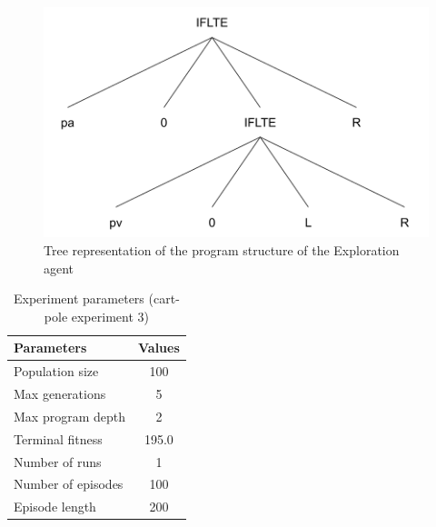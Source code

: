 \begin{figure}[ht]
    \centering
    \includegraphics[width=12cm]{images/complex_iflte_program.png}
    \caption{Tree representation of the program structure of the Exploration agent}
    \label{fig:deep_iflte_tree}
\end{figure}

\begin{table}[ht]
    \centering
    \begin{tabular}{|l|c|}
        \hline
        \textbf{Parameters} & \textbf{Values} \\
        \hline
        Population size     & 100  \\
        Max generations     & 5  \\
        Max program depth   & 2  \\
        Terminal fitness & 195.0 \\
        Number of runs      & 1   \\
        Number of episodes  & 100 \\
        Episode length      & 200  \\
        \hline
    \end{tabular}
    \caption{Experiment parameters (cart-pole experiment 3)}
    \label{tab:cartpole_exp3_params}
\end{table}

